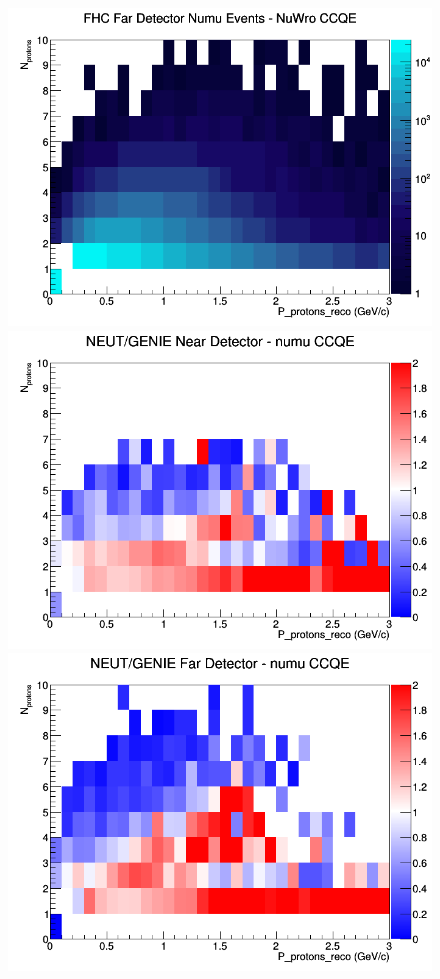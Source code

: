 \begin{figure}[h]
\endminipage
{}
\includegraphics[width=\linewidth]{eff_N_P/FGT/protons/CCQE_FHC_FD_numu_N_P_NuWro.png}
\endminipage
\newline
{}
\includegraphics[width=\linewidth]{eff_N_P/FGT/protons/ratios/CCQE_NEUT_GENIE_numu_near_N_P.png}
\endminipage
{}
\includegraphics[width=\linewidth]{eff_N_P/FGT/protons/ratios/CCQE_NEUT_GENIE_numu_far_N_P.png}

\end{figure}
